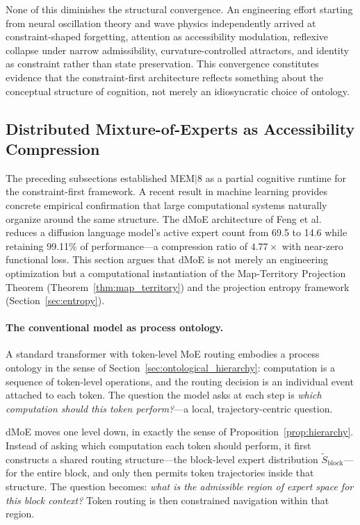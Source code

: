 \documentclass[12pt, a4paper, twoside]{article}
\theoremstyle{plain}
\theoremstyle{definition}
\theoremstyle{remark}
\begin{document}
None of this diminishes the structural convergence. An engineering effort
starting from neural oscillation theory and wave physics independently arrived
at constraint-shaped forgetting, attention as accessibility modulation, reflexive
collapse under narrow admissibility, curvature-controlled attractors, and
identity as constraint rather than state preservation. This convergence
constitutes evidence that the constraint-first architecture reflects something
about the conceptual structure of cognition, not merely an idiosyncratic choice
of ontology.


\subsection{Distributed Mixture-of-Experts as Accessibility Compression}
\label{subsec:dmoe}

The preceding subsections established MEM$|$8 as a partial cognitive runtime
for the constraint-first framework. A recent result in machine learning
provides concrete empirical confirmation that large computational systems
naturally organize around the same structure. The dMoE architecture of
Feng et al.~\cite{dmoe_2026} reduces a diffusion language model's active
expert count from 69.5 to 14.6 while retaining 99.11\% of performance---a
compression ratio of $4.77\times$ with near-zero functional loss. This
section argues that dMoE is not merely an engineering optimization but a
computational instantiation of the Map-Territory Projection Theorem
(Theorem~\ref{thm:map_territory}) and the projection entropy framework
(Section~\ref{sec:entropy}).

\paragraph{The conventional model as process ontology.}
A standard transformer with token-level MoE routing embodies a process
ontology in the sense of Section~\ref{sec:ontological_hierarchy}: computation
is a sequence of token-level operations, and the routing decision is an
individual event attached to each token. The question the model asks at
each step is \emph{which computation should this token perform?}---a local,
trajectory-centric question.

dMoE moves one level down, in exactly the sense of Proposition~\ref{prop:hierarchy}.
Instead of asking which computation each token should perform, it first
constructs a shared routing structure---the block-level expert distribution
$\widetilde{S}_{\mathrm{block}}$---for the entire block, and only then
permits token trajectories inside that structure. The question becomes:
\emph{what is the admissible region of expert space for this block context?}
Token routing is then constrained navigation within that region.
\end{document}
